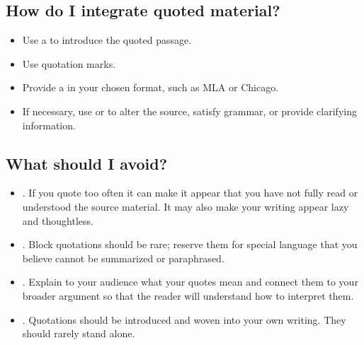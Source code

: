 \subsection{How do I integrate quoted material?}

 \begin{itemize}
\item Use a \hyperlink{signalphrase}{\color{Ahrenge}{signal phrase}} to introduce the quoted passage.

\item Use quotation marks.

\item Provide a \hyperlink{citation}{\color{Ahrenge}{citation}} in your chosen format, such as MLA or Chicago.

\item If necessary, use \hyperlink{ellipsis}{\color{Ahrenge}{ellipsis}} or \hyperlink{brackets}{\color{Ahrenge}{brackets}} to alter the source,
satisfy grammar, or provide clarifying information.

\end{itemize}


\subsection{What should I avoid?}

\begin{itemize}
\item {}. If you quote too often it can
make it appear that you have not fully read or understood the source material.
It may also make your writing appear lazy and thoughtless.

\item {}. Block quotations should
be rare; reserve them for special language that you believe cannot be
summarized or paraphrased. 

\item {}. Explain to your audience what your quotes mean and connect them to your broader argument so that the reader will understand how to interpret them.

\item {}. Quotations
should be introduced and woven into your own writing. They should rarely stand alone.

\end{itemize}

